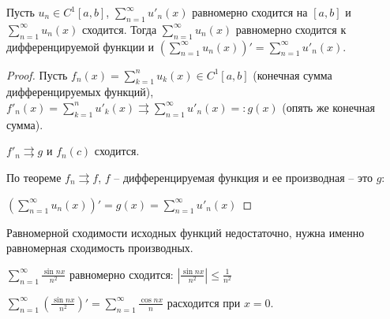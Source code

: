 \begin{corollary}
    Пусть $u_n\in C^1[a, b]$, $\sum\limits_{n=1}^\infty u'_n(x)$ равномерно сходится на $[a, b]$ и $\sum\limits_{n=1}^\infty u_n(x)$ сходится. Тогда $\sum\limits_{n=1}^\infty u_n(x)$ равномерно сходится к дифференцируемой функции и $(\sum\limits_{n=1}^\infty u_n(x))'=\sum\limits_{n=1}^\infty u'_n(x)$.
\end{corollary}

\begin{proof}
    Пусть $f_n(x)=\sum\limits_{k=1}^n u_k(x)\in C^1[a, b]$ (конечная сумма дифференцируемых функций), $f'_n(x)=\sum\limits_{k=1}^n u'_k(x)\rightrightarrows  \sum\limits_{n=1}^\infty u'_n(x)=: g(x)$ (опять же конечная сумма).

    $f'_n\rightrightarrows g$ и $f_n(c)$ сходится. 

    По теореме $f_n\rightrightarrows f$, $f$ – дифференцируемая функция и ее производная – это $g$:

    $(\sum\limits_{n=1}^\infty u_n(x))'=g(x)=\sum\limits_{n=1}^\infty u'_n(x)$
\end{proof}

\begin{remark}
    Равномерной сходимости исходных функций недостаточно, нужна именно равномерная сходимость производных.

    \begin{example}
        $\sum\limits_{n=1}^\infty \frac{\sin nx}{n^2}$ равномерно сходится: $|\frac{\sin nx}{n^2}|\leq \frac{1}{n^2}$

        $\sum\limits_{n=1}^\infty (\frac{\sin nx}{n^2})'=\sum\limits_{n=1}^\infty \frac{\cos nx}{n}$ расходится при $x=0$.
    \end{example}
\end{remark}